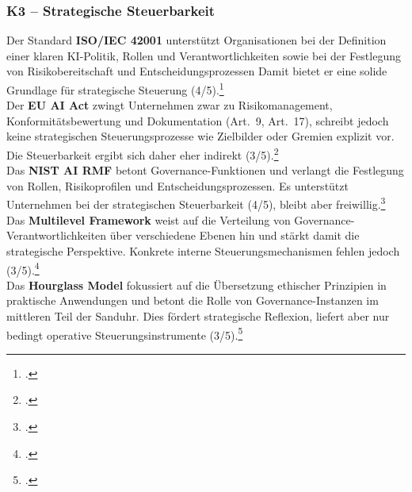 \subsubsection{K3 – Strategische Steuerbarkeit}
Der Standard \textbf{ISO/IEC 42001} unterstützt Organisationen bei der Definition einer klaren KI-Politik, Rollen und Verantwortlichkeiten sowie bei der Festlegung von Risikobereitschaft und Entscheidungsprozessen
Damit bietet er eine solide Grundlage für strategische Steuerung (4/5).\footcite[][Kap.~4.1, 5.1--5.3]{isoISOIEC42001}
\\
Der \textbf{EU AI Act} zwingt Unternehmen zwar zu Risikomanagement, Konformitätsbewertung und Dokumentation (Art.~9, Art.~17), schreibt jedoch keine strategischen Steuerungsprozesse wie Zielbilder oder Gremien explizit vor.
Die Steuerbarkeit ergibt sich daher eher indirekt (3/5).\footcite[][3-4]{europeanparliamentaryresearchserviceArtificialIntelligenceAct2024}
\\
Das \textbf{NIST AI RMF} betont Governance-Funktionen und verlangt die Festlegung von Rollen, Risikoprofilen und Entscheidungsprozessen.
Es unterstützt Unternehmen bei der strategischen Steuerbarkeit (4/5), bleibt aber freiwillig.\footcite[][6-8]{nationalinstituteofstandardsandtechnologyAIRiskManagement2021}
\\
Das \textbf{Multilevel Framework} weist auf die Verteilung von Governance-Verantwortlichkeiten über verschiedene Ebenen hin und stärkt damit die strategische Perspektive.
Konkrete interne Steuerungsmechanismen fehlen jedoch (3/5).\footcite[][S.~7--9]{choungMultilevelFrameworkAI2023}
\\
Das \textbf{Hourglass Model} fokussiert auf die Übersetzung ethischer Prinzipien in praktische Anwendungen und betont die Rolle von Governance-Instanzen im mittleren Teil der \glqq{}Sanduhr\grqq{}.
Dies fördert strategische Reflexion, liefert aber nur bedingt operative Steuerungsinstrumente (3/5).\footcite[][S.~4--5]{mantymakiPDFPuttingAI2025}


